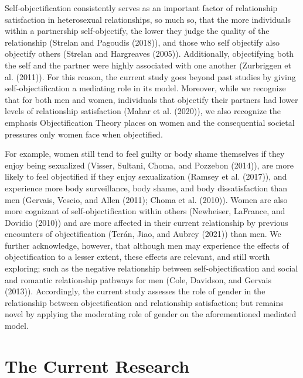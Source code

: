 \documentclass[
  english,
  man]{apa6}
\begin{document}
Self-objectification consistently serves as an important factor of relationship satisfaction in heterosexual relationships, so much so, that the more individuals within a partnership self-objectify, the lower they judge the quality of the relationship (Strelan and Pagoudis (2018)), and those who self objectify also objectify others (Strelan and Hargreaves (2005)). Additionally, objectifying both the self and the partner were highly associated with one another (Zurbriggen et al. (2011)). For this reason, the current study goes beyond past studies by giving self-objectification a mediating role in its model. Moreover, while we recognize that for both men and women, individuals that objectify their partners had lower levels of relationship satisfaction (Mahar et al. (2020)), we also recognize the emphasis Objectification Theory places on women and the consequential societal pressures only women face when objectified.

For example, women still tend to feel guilty or body shame themselves if they enjoy being sexualized (Visser, Sultani, Choma, and Pozzebon (2014)), are more likely to feel objectified if they enjoy sexualization (Ramsey et al. (2017)), and experience more body surveillance, body shame, and body dissatisfaction than men (Gervais, Vescio, and Allen (2011); Choma et al. (2010)). Women are also more cognizant of self-objectification within others (Newheiser, LaFrance, and Dovidio (2010)) and are more affected in their current relationship by previous encounters of objectification (Terán, Jiao, and Aubrey (2021)) than men. We further acknowledge, however, that although men may experience the effects of objectification to a lesser extent, these effects are relevant, and still worth exploring; such as the negative relationship between self-objectification and social and romantic relationship pathways for men (Cole, Davidson, and Gervais (2013)). Accordingly, the current study assesses the role of gender in the relationship between objectification and relationship satisfaction; but remains novel by applying the moderating role of gender on the aforementioned mediated model.

\hypertarget{the-current-research}{%
\section{The Current Research}\label{the-current-research}}
\end{document}
